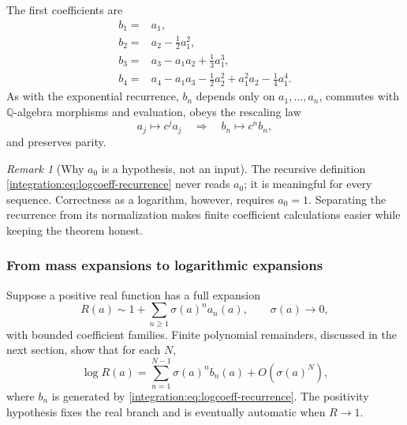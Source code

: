 \documentclass[11pt,oneside]{article}
\theoremstyle{definition}
\theoremstyle{remark}
\newtheorem{remark}[remark]{Remark}
\newcommand{\Q}{\mathbb Q}
\begin{document}
The first coefficients are
\begin{align}
 b_1={}&a_1,                                                  \label{integration:eq:b1}\\
 b_2={}&a_2-\frac12a_1^2,                                   \label{integration:eq:b2}\\
 b_3={}&a_3-a_1a_2+\frac13a_1^3,                            \label{integration:eq:b3}\\
 b_4={}&a_4-a_1a_3-\frac12a_2^2+a_1^2a_2-\frac14a_1^4.     \label{integration:eq:b4}
\end{align}
As with the exponential recurrence, $b_n$ depends only on $a_1,\ldots,a_n$, commutes with
$\Q$-algebra morphisms and evaluation, obeys the rescaling law
\begin{equation}
 a_j\mapsto c^ja_j\quad\Longrightarrow\quad b_n\mapsto c^nb_n,
 \label{integration:eq:logcoeff-rescale}
\end{equation}
and preserves parity.

\begin{remark}[Why $a_0$ is a hypothesis, not an input]
The recursive definition \eqref{integration:eq:logcoeff-recurrence} never reads $a_0$; it is meaningful
for every sequence.  Correctness as a logarithm, however, requires $a_0=1$.  Separating the
recurrence from its normalization makes finite coefficient calculations easier while keeping
the theorem honest.
\end{remark}

\subsubsection{From mass expansions to logarithmic expansions}

Suppose a positive real function has a full expansion
\begin{equation}
 R(a)\sim1+\sum_{n\ge1}\sigma(a)^na_n(a),
 \qquad \sigma(a)\to0,
 \label{integration:eq:mass-expansion-before-log}
\end{equation}
with bounded coefficient families.  Finite polynomial remainders, discussed in the next
section, show that for each $N$,
\begin{equation}
 \log R(a)=\sum_{n=1}^{N-1}\sigma(a)^nb_n(a)+O(\sigma(a)^N),
 \label{integration:eq:log-asymptotic-transfer}
\end{equation}
where $b_n$ is generated by \eqref{integration:eq:logcoeff-recurrence}.  The positivity hypothesis fixes
the real branch and is eventually automatic when $R\to1$.
\end{document}
